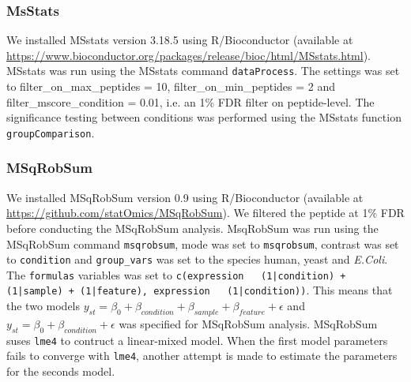 \documentclass[10pt,letterpaper]{article}
\begin{document}


\subsubsection*{MsStats}

We installed MSstats version 3.18.5 using R/Bioconductor (available at \url{https://www.bioconductor.org/packages/release/bioc/html/MSstats.html}). MSstats was run using the MSstats command \texttt{dataProcess}. The settings was set to filter\_on\_max\_peptides = 10, filter\_on\_min\_peptides = 2 and filter\_mscore\_condition = 0.01, i.e. an 1\% FDR filter on peptide-level. The significance testing between conditions was performed using the MSstats function \texttt{groupComparison}.  


\subsubsection*{MSqRobSum}

We installed MSqRobSum version 0.9 using R/Bioconductor (available at \url{https://github.com/statOmics/MSqRobSum}). We filtered the peptide at 1\% FDR before conducting the MSqRobSum analysis. MsqRobSum was run using the MSqRobSum command \texttt{msqrobsum}, mode was set to \texttt{msqrobsum}, contrast was set to \texttt{condition} and \texttt{group\_vars} was set to the species human, yeast and \textit{E.Coli}. The \texttt{formulas} variables was set to \texttt{c(expression ~ (1|condition) + (1|sample) + (1|feature), expression ~ (1|condition))}. This means that the two models $y_{st} = \beta_0 + \beta_{condition} + \beta_{sample} + \beta_{feature} + \epsilon$ and $y_{st} = \beta_0 + \beta_{condition} + \epsilon$ was specified for MSqRobSum analysis. MSqRobSum suses \texttt{lme4} to contruct a linear-mixed model. When the first model parameters fails to converge with \texttt{lme4}, another attempt is made to estimate the parameters for the seconds model.

\end{document}

